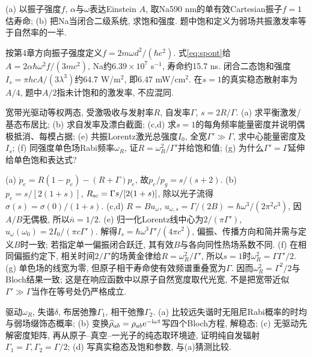 \begin{exercise}(a) 以振子强度$f$, $\alpha$与$\omega$表达Einstein $A$, 取Na590 nm的单有效Cartesian振子$f=1$估寿命; (b) 把Na当闭合二级系统, 求饱和强度. 题中饱和定义为弱场共振激发率等于自然率的一半.\end{exercise}
\begin{solution}按第4章方向振子强度定义$f=2m\omega d^2/(\hbar e^2)$. 式\eqref{eq:spont}给$A=2\alpha\hbar\omega^2f/(3mc^2)$, Na约$6.39\times10^7$ s$^{-1}$, 寿命约15.7 ns. 闭合二态饱和强度$I_s=\pi hcA/(3\lambda^3)$约64.7 W/m$^2$, 即6.47 mW/cm$^2$. 在$s=1$的真实稳态散射率为$A/4$, 题中$A/2$指未计饱和的激发率, 不应混同.
\end{solution}
\begin{exercise}宽带光驱动等权两态, 受激吸收与发射率$R$, 自发率$\Gamma$, $s=2R/\Gamma$. (a) 求平衡激发/基态布居比; (b) 求自发率及漂白截面; (c,d) 求$s=1$的每角频率能量密度并说明偶极抵消、每模占据; (e) 共振Lorentz激光总强度$I_0$, 全宽$\Gamma'\gg\Gamma$, 求中心能量密度及$I_s$; (f) 同强度单色场Rabi频率$\omega_R$, 证$R=\omega_R^2/\Gamma'$并给饱和值; (g) 为什么$\Gamma'=\Gamma$延伸给单色饱和表达式?\end{exercise}
\begin{solution}(a) $\dot p_e=R(1-p_e)-(R+\Gamma)p_e$, 故$p_e/p_g=s/(s+2)$. (b) $p_e=s/[2(1+s)]$, $R_{\rm sc}=\Gamma s/[2(1+s)]$, 除以光子流得$\sigma(s)=\sigma(0)/(1+s)$. (c,d) $R=Bu_\omega$, $u_{\omega,s}=\Gamma/(2B)=\hbar\omega^3/(2\pi^2c^3)$, 因$A/B$无偶极, 所以$\bar n=1/2$. (e) 归一化Lorentz线中心为$2/(\pi\Gamma')$, $u_\omega(\omega_0)=2I_0/(\pi c\Gamma')$. 解得$I_s=\hbar\omega^3\Gamma'/(4\pi c^2)$, 偏振、传播方向和简并需与定义$B$时一致; 若指定单一偏振闭合跃迁, 其有效$B$与各向同性热场系数不同. (f) 在相同偏振约定下, 相关时间$2/\Gamma'$的场黄金律给$R=\omega_R^2/\Gamma'$, 所以$s=1$时$\omega_R^2=\Gamma\Gamma'/2$. (g) 单色场的线宽为零, 但原子相干寿命使有效频谱重叠宽为$\Gamma$. 因而$\omega_R^2=\Gamma^2/2$与Bloch结果一致; 这是在响应函数中以原子自然宽度取代光宽, 不是把宽带近似$\Gamma'\gg\Gamma$当作在等号处仍严格成立.
\end{solution}
\begin{exercise}驱动$\omega_R$, 失谐$\delta$, 布居弛豫$\Gamma_1$, 相干弛豫$\Gamma_2$. (a) 比较远失谐时无阻尼Rabi概率的时均与弱场缀饰态概率; (b) 变换$\widehat\rho_{ab}=\rho_{ab}\mathrm e^{-\mathrm i\omega t}$写四个Bloch方程, 解稳态; (c) 无驱动先解密度矩阵, 再从原子--真空--一光子的纯态取环境迹, 证明纯自发辐射$\Gamma_1=\Gamma,\Gamma_2=\Gamma/2$; (d) 写真实稳态及饱和参数, 与(a)猜测比较.\end{exercise}

